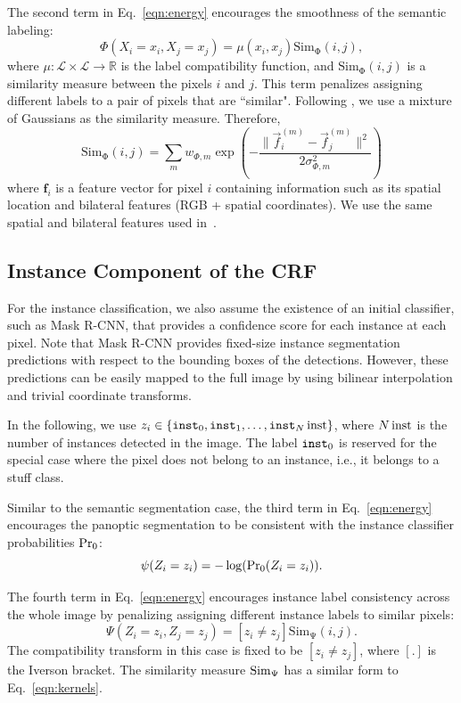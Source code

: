 The second term in Eq.~\eqref{eqn:energy} encourages the smoothness of the semantic labeling:
\begin{equation}
\label{eq:similarity}
\Phi(X_i = x_i, X_j = x_j) = \mu(x_i, x_j) \operatorname{Sim_\Phi}(i, j),
\end{equation}
where $\mu: \mathcal{L} \times \mathcal{L} \to \mathbb{R}$ is the label compatibility function, and $\operatorname{Sim_\Phi}(i, j)$ is a similarity measure between the pixels $i$ and $j$. This term penalizes assigning different labels to a pair of pixels that are ``similar". Following \cite{densecrf}, we use a mixture of Gaussians as the similarity measure. Therefore,
\begin{equation}
\label{eqn:kernels}
\operatorname{Sim_\Phi}(i, j) = \sum_m w_{\Phi, m} \exp\left(-\frac{\|\vec{f}_i^{(m)} - \vec{f}_j^{(m)}\|^2}{2\sigma_{\Phi,m}^2}\right)
\end{equation}
where $\mathbf{f}_i$ is a feature vector for pixel $i$ containing information such as its spatial location and bilateral features (RGB + spatial coordinates). We use the same spatial and bilateral features used in~\cite{densecrf}.
\subsection{Instance Component of the CRF}

For the instance classification, we also assume the existence of an initial classifier, such as Mask R-CNN, that provides a confidence score for each instance at each pixel. Note that Mask R-CNN provides fixed-size instance segmentation predictions with respect to the bounding boxes of the detections. However, these predictions can be easily mapped to the full image by using bilinear interpolation and trivial coordinate transforms.

In the following, we use $z_i \in \{\texttt{inst}_0, \texttt{inst}_1, \dots, \texttt{inst}_N\operatorname{inst} \}$, where $N\operatorname{inst}$ is the number of instances detected in the image. The label $\texttt{inst}_0$ is reserved for the special case where the pixel does not belong to an instance, i.e., it belongs to a stuff class.

Similar to the semantic segmentation case, the third term in Eq.~\eqref{eqn:energy} encourages the panoptic segmentation to be consistent with the instance classifier probabilities $\operatorname{Pr_0}$:
\begin{equation}
\psi(Z_i = z_i) = - \log(\operatorname{Pr_0}(Z_i = z_i)).
\end{equation}

The fourth term in Eq.~\eqref{eqn:energy} encourages instance label consistency across the whole image by penalizing assigning different instance labels to similar pixels:
\begin{equation}
\Psi(Z_i = z_i, Z_j = z_j) = [z_i \neq z_j] \operatorname{Sim_\Psi}(i, j).
\end{equation}
The compatibility transform in this case is fixed to be $[z_i \neq z_j]$, where $[.]$ is the Iverson bracket. The similarity measure $\operatorname{Sim}_\Psi$ has a similar form to Eq.~\eqref{eqn:kernels}. %

